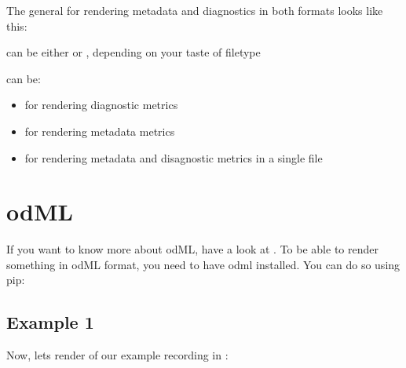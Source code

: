 \documentclass[letterpaper,10pt,english]{sphinxmanual}
\begin{document}
The general  for rendering metadata and diagnostics in both formats looks like this:

%
\begin{sphinxVerbatim}[commandchars=\\\{\}]
     
\end{sphinxVerbatim}

 can be either  or , depending on your taste of filetype

 can be:
\begin{itemize}
\item {} 
 for rendering diagnostic metrics

\item {} 
 for rendering metadata metrics

\item {} 
 for rendering metadata and disagnostic metrics in a single file

\end{itemize}


\section{odML}
\label{\detokenize{access_metadata:odml}}\label{\detokenize{access_metadata:metaodml}}
If you want to know more about odML, have a look at .
To be able to render something in odML format, you need to have odml installed. You can do so using pip:

%
\begin{sphinxVerbatim}[commandchars=\\\{\}]
   
\end{sphinxVerbatim}


\subsection{Example 1}
\label{\detokenize{access_metadata:example-1}}\label{\detokenize{access_metadata:example1-meta}}
Now, lets render  of our example recording in :
\end{document}
